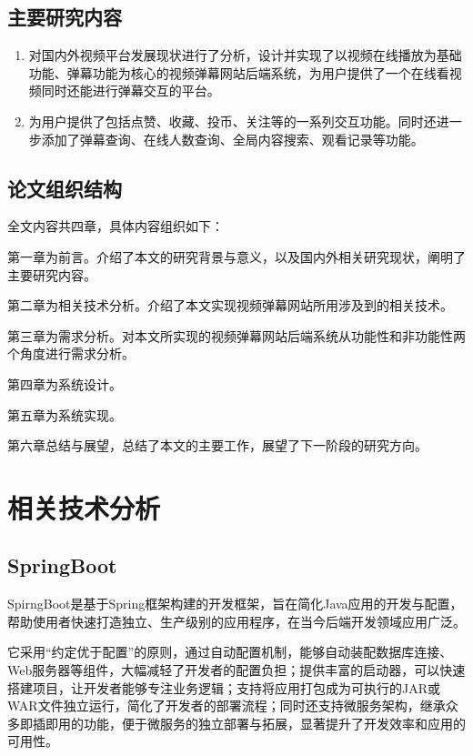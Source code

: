 \subsection{主要研究内容}

\begin{enumerate}[label=(\arabic*)]
    \item 对国内外视频平台发展现状进行了分析，设计并实现了以视频在线播放为基础功能、弹幕功能为核心的视频弹幕网站后端系统，为用户提供了一个在线看视频同时还能进行弹幕交互的平台。
    \label{系统目标}
    \item 为用户提供了包括点赞、收藏、投币、关注等的一系列交互功能。同时还进一步添加了弹幕查询、在线人数查询、全局内容搜索、观看记录等功能。
    \end{enumerate}

\subsection{论文组织结构}

全文内容共四章，具体内容组织如下：

第一章为前言。介绍了本文的研究背景与意义，以及国内外相关研究现状，阐明了主要研究内容。

第二章为相关技术分析。介绍了本文实现视频弹幕网站所用涉及到的相关技术。

第三章为需求分析。对本文所实现的视频弹幕网站后端系统从功能性和非功能性两个角度进行需求分析。

第四章为系统设计。

第五章为系统实现。

第六章总结与展望，总结了本文的主要工作，展望了下一阶段的研究方向。

\newpage

\section{相关技术分析}
\subsection{SpringBoot}

SpirngBoot是基于Spring框架构建的开发框架，旨在简化Java应用的开发与配置，帮助使用者快速打造独立、生产级别的应用程序，在当今后端开发领域应用广泛。

它采用“约定优于配置”的原则，通过自动配置机制，能够自动装配数据库连接、Web服务器等组件，大幅减轻了开发者的配置负担\label{SpringBoot特性}；提供丰富的启动器，可以快速搭建项目，让开发者能够专注业务逻辑；支持将应用打包成为可执行的JAR或WAR文件独立运行，简化了开发者的部署流程；同时还支持微服务架构，继承众多即插即用的功能，便于微服务的独立部署与拓展，显著提升了开发效率和应用的可用性。

